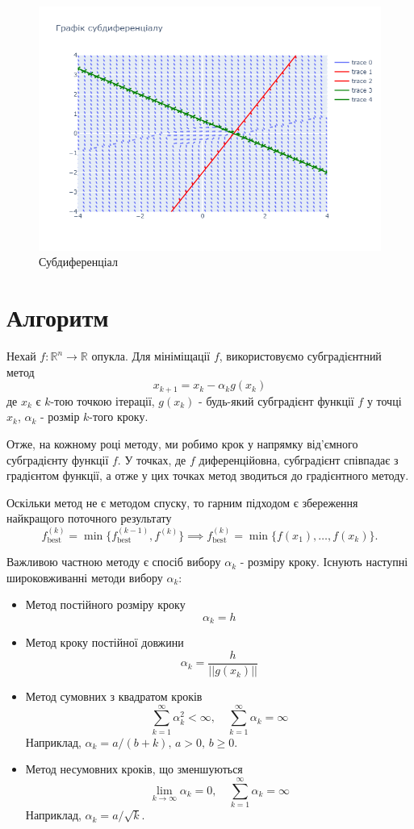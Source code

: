 \documentclass[a4paper, 14pt]{extarticle}
\begin{document}
\begin{figure}[h]
    \centering
    \caption{Субдиференціал}
    \includegraphics[width = \textwidth]{subdifferential.png}
\end{figure}
\newpage
\section{Алгоритм}
Нехай $f:\mathbb{R}^n\to\mathbb{R}$ опукла. Для мініміщації $f$,
використовуємо субградієнтний метод
\begin{equation}
    x_{k+1} = x_k - \alpha_k g(x_k)
\end{equation} 
де $x_k$ є $k$-тою точкою ітерації, $g(x_k)$ - будь-який субградієнт 
функції $f$ у точці $x_k$, $\alpha_k$ - розмір $k$-того кроку.

Отже, на кожному році методу, ми робимо крок у напрямку 
від'ємного субградієнту функції $f$. У точках, де 
$f$ диференційовна, субградієнт співпадає з градієнтом функції, а отже 
у цих точках метод зводиться до градієнтного методу.

Оскільки метод не є методом спуску, то гарним підходом 
є збереження найкращого поточного результату 
\begin{equation*}
    f^{(k)}_{\text{best}} = \min\{f^{(k-1)}_{\text{best}}, f^{(k)}\}
    \implies f^{(k)}_{\text{best}} =
    \min\{f(x_1),\hdots , f(x_k)\}.
\end{equation*}

Важливою частною методу є спосіб вибору $\alpha_k$ - розміру кроку.
Існують наступні широковживанні методи вибору $\alpha_k$:
\begin{itemize}
    \item Метод постійного розміру кроку
    \[
    \alpha_k = h    
    \]
    \item Метод кроку постійної довжини
    \[
    \alpha_k = \frac{h}{||g(x_k)||}    
    \]
    \item Метод сумовних з квадратом кроків
    \[
    \sum_{k=1}^\infty \alpha_k^2 <\infty, \quad 
    \sum_{k=1}^\infty \alpha_k = \infty
    \]
    Наприклад, $\alpha_k = a/(b+k), \, a>0,\,b\geq0$.
    \item Метод несумовних кроків, що зменшуються
    \[
        \lim_{k\to\infty}\alpha_k = 0,
        \quad\sum_{k=1}^\infty \alpha_k = \infty  
    \]
    Наприклад, $\alpha_k = a/\sqrt{k}$.
\end{itemize}
\end{document}
